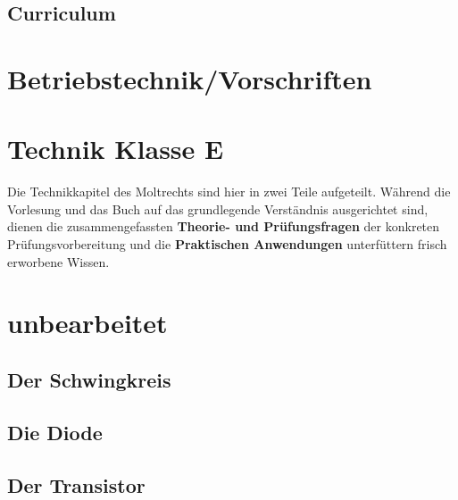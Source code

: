 \documentclass[ngerman, openany, twoside]{texdata/Script}
\begin{document}
\chapter{Curriculum}


\setcounter{chapter}{20}
\part{Betriebstechnik/Vorschriften}

    

\setcounter{chapter}{30}
\part{Technik Klasse E}

    Die Technikkapitel des Moltrechts sind hier in zwei Teile aufgeteilt.
    Während die Vorlesung und das Buch auf das grundlegende Verständnis
    ausgerichtet sind, dienen die zusammengefassten \textbf{Theorie- und
    Prüfungsfragen} der konkreten Prüfungsvorbereitung und die
    \textbf{Praktischen Anwendungen} unterfüttern frisch erworbene Wissen.

\clearpage




\part{unbearbeitet}



\chapter{Der Schwingkreis}


\chapter{Die Diode}


\chapter{Der Transistor}


\newpage \vspace*{5cm}
\newpage
\end{document}
